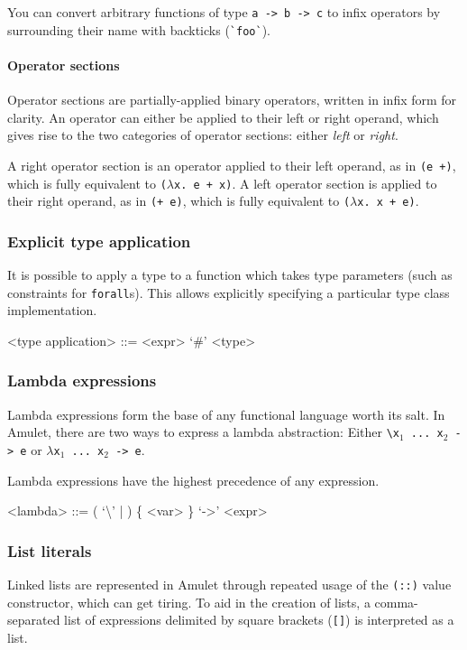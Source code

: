 You can convert arbitrary functions of type \texttt{a -> b -> c} to infix operators by surrounding their name with backticks (\texttt{\`{}foo\`{}}).

\paragraph{Operator sections}

Operator sections are partially-applied binary operators, written in infix form for clarity. An operator can either be applied to their left or right operand, which gives rise to the two categories of operator sections: either \textit{left} or \textit{right}.

A right operator section is an operator applied to their left operand, as in \texttt{(e +)}, which is fully equivalent to \texttt{($\lambda$x. e + x)}. A left operator section is applied to their right operand, as in \texttt{(+ e)}, which is fully equivalent to \texttt{($\lambda$x. x + e)}.

\subsubsection{Explicit type application}
It is possible to apply a type to a function which takes type parameters (such as constraints for \texttt{forall}s). This allows explicitly specifying a particular type class implementation.

\begin{grammar}
<type application> ::= <expr> `#' <type>
\end{grammar}

\subsubsection{Lambda expressions}

Lambda expressions form the base of any functional language worth its salt. In Amulet, there are two ways to express a lambda abstraction: Either \texttt{\textbackslash x$_1$ ... x$_2$ -> e} or \texttt{$\lambda$x$_1$ ... x$_2$ -> e}.

Lambda expressions have the highest precedence of any expression.

\begin{grammar}
<lambda> ::= ( `\textbackslash' | \lit{$\lambda$} ) \{ <var> \} `->' <expr>
\end{grammar}

\subsubsection{List literals}
Linked lists are represented in Amulet through repeated usage of the \texttt{(::)} value constructor, which can get tiring. To aid in the creation of lists, a comma-separated list of expressions delimited by square brackets (\texttt{[]}) is interpreted as a list.

